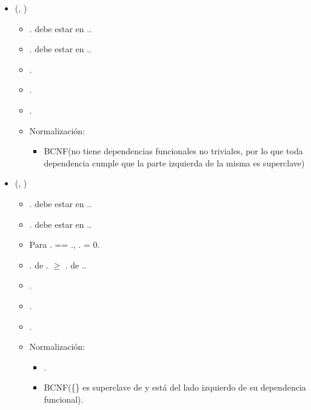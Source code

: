\begin{itemize}
    \item {}(, )
          \begin{itemize}
              \item {}. debe estar en
                    ..
              \item {}. debe estar en
                    ..
              \item {}.
              \item {}.
              \item {}.
              \item Normalización:
                    \begin{itemize}
                        \item BCNF(no tiene dependencias funcionales no triviales, por lo que toda
                              dependencia cumple que la parte izquierda de la misma es superclave)
                    \end{itemize}

          \end{itemize}

    \item {}(,
          )
          \begin{itemize}
              \item {}. debe estar en
                    ..
              \item {}. debe estar en
                    ..
              \item Para . == .,
                    . = 0.
              \item {}. de
                    . $\geq$
                    . de
                    ..
              \item {}.
              \item {}.
              \item {}.
              \item Normalización:
                    \begin{itemize}
                        \item {}.
                        \item BCNF(\{\} es superclave de  y está del lado
                              izquierdo de su dependencia funcional).
                    \end{itemize}
          \end{itemize}


\end{itemize}
